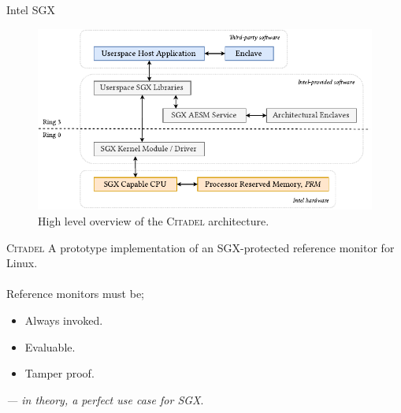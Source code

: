 \documentclass[xcolor=dvipsnames]{beamer}
\begin{document}
\begin{frame}{Intel SGX}
    \begin{figure}[]
        \centering
        \includegraphics[width=0.99\linewidth]{../figures/SGX-AdvArchitecture.pdf}
        \vspace{5mm}
        \caption{High level overview of the \textsc{Citadel} architecture.}
        \label{fig:citadel-overview}
    \end{figure}
\end{frame}

\begin{frame}{\textsc{Citadel}}
    A prototype implementation of an SGX-protected reference monitor for Linux. \\ \\
    Reference monitors must be;
    \begin{itemize}
        \item Always invoked.
        \item Evaluable.
        \item Tamper proof.
    \end{itemize}
    \vspace{5mm}
    \textit{---  in theory, a perfect use case for SGX}.
\end{frame}
\end{document}
